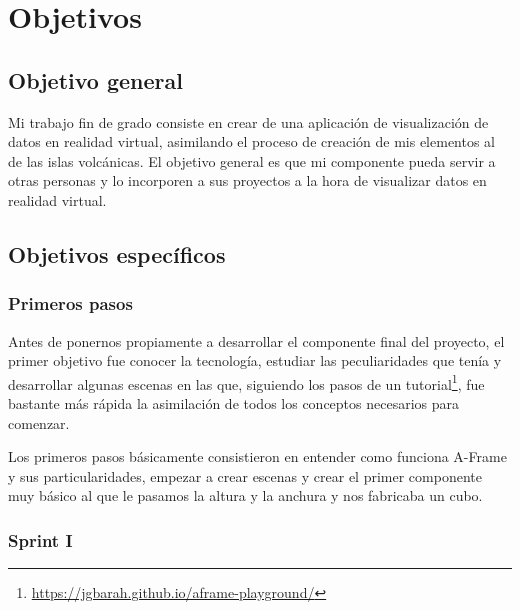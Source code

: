 \documentclass[a4paper, 12pt]{book}
\begin{document}
\cleardoublepage %
\chapter{Objetivos} %
\label{chap:objetivos} %

\section{Objetivo general} %
\label{sec:objetivo-general} %


Mi trabajo fin de grado consiste en crear de una aplicación de visualización de datos en realidad virtual, asimilando el proceso de creación de mis elementos al de las islas volcánicas. El objetivo general es que mi componente pueda servir a otras personas y lo incorporen a sus proyectos a la hora de visualizar datos en realidad virtual.

\section{Objetivos específicos}
\label{sec:objetivos-especificos}

\subsection{Primeros pasos}
\label{subsec:primerospasos}

Antes de ponernos propiamente a desarrollar el componente final del proyecto, el primer objetivo fue conocer la tecnología, estudiar las peculiaridades que tenía y desarrollar algunas escenas en las que, siguiendo los pasos de un tutorial\footnote{\url{https://jgbarah.github.io/aframe-playground/}}, fue bastante más rápida la asimilación de todos los conceptos necesarios para comenzar.

Los primeros pasos básicamente consistieron en entender como funciona A-Frame y sus particularidades, empezar a crear escenas y crear el primer componente muy básico al que le pasamos la altura y la anchura y nos fabricaba un cubo.


\subsection{Sprint I}
\label{subsec:primer sprint}
\end{document}
